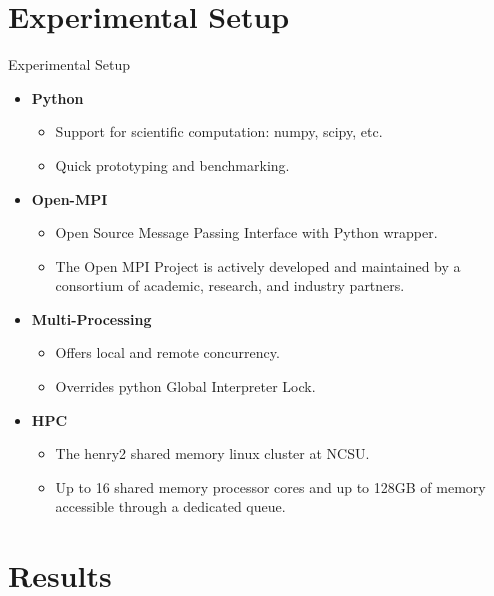 \documentclass[10pt]{beamer}
\begin{document}
\section{Experimental Setup}
\begin{frame}{Experimental Setup}
    \begin{itemize}
    \item<1-> \textbf{Python}
        \begin{itemize}
        \item Support for scientific computation: numpy, scipy, etc.
        \item Quick prototyping and benchmarking.
        \end{itemize}
    \item<2-> \textbf{Open-MPI}
        \begin{itemize}
        \item Open Source Message Passing Interface with Python wrapper.
        \item The Open MPI Project is actively developed and maintained by a consortium of academic, research, and industry partners.
        \end{itemize}
    \item<3-> \textbf{Multi-Processing}
        \begin{itemize}
        \item Offers local and remote concurrency.
        \item Overrides python Global Interpreter Lock.
        \end{itemize}
    \item<4-> \textbf{HPC}
        \begin{itemize}
        \item The henry2 shared memory linux cluster at NCSU.
        \item Up to 16 shared memory processor cores and up to 128GB of memory accessible through a dedicated queue.
        \end{itemize}
    \end{itemize}
\end{frame}

\section{Results}
\end{document}
